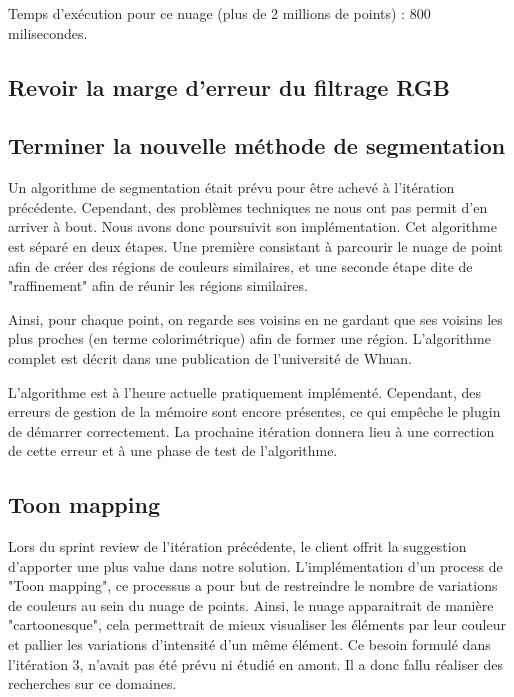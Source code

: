 \documentclass[12pt,titlepage,french]{article}
\begin{document}
Temps d'exécution pour ce nuage (plus de 2 millions de points) : 800 milisecondes.

\subsection{Revoir la marge d'erreur du filtrage RGB}

\subsection{Terminer la nouvelle méthode de segmentation}

Un algorithme de segmentation était prévu pour être achevé à l'itération précédente. Cependant, des problèmes techniques ne nous ont pas permit d'en arriver à bout. Nous avons donc poursuivit son implémentation. Cet algorithme est séparé en deux étapes. Une première consistant à parcourir le nuage de point afin de créer des régions de couleurs similaires, et une seconde étape dite de "raffinement" afin de réunir les régions similaires. \newline

Ainsi, pour chaque point, on regarde ses voisins en ne gardant que ses voisins les plus proches (en terme colorimétrique) afin de former une région. L'algorithme complet est décrit dans une publication de l'université de \cite{B03} Whuan. \newline

L'algorithme est à l'heure actuelle pratiquement implémenté. Cependant, des erreurs de gestion de la mémoire sont encore présentes, ce qui empêche le plugin de démarrer correctement. La prochaine itération donnera lieu à une correction de cette erreur et à une phase de test de l'algorithme.

\subsection{Toon mapping}

Lors du sprint review de l'itération précédente, le client offrit la suggestion d'apporter une plus value dans notre solution.
L'implémentation d'un process de "Toon mapping", ce processus a pour but de restreindre le nombre de variations de couleurs au sein du nuage de points. 
Ainsi, le nuage apparaitrait de manière "cartoonesque", cela permettrait de mieux visualiser les éléments par leur couleur et pallier les variations d'intensité d'un même élément.
Ce besoin formulé dans l'itération 3, n'avait pas été prévu ni étudié en amont. Il a donc fallu réaliser des recherches sur ce domaines.
\end{document}
